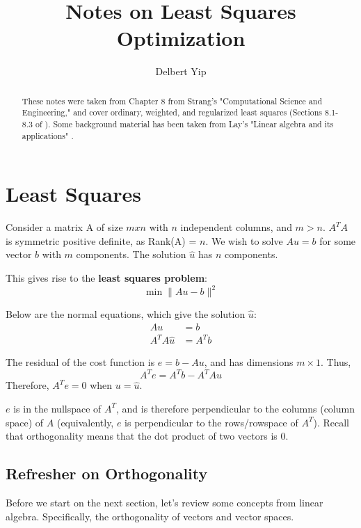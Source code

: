 \documentclass[]{article}
\title{Notes on Least Squares Optimization}
\author{Delbert Yip}
\begin{document}
\maketitle

\begin{abstract}
	These notes were taken from Chapter 8 from Strang's "Computational Science and Engineering," \cite{strang_computational_2012} and cover ordinary, weighted, and regularized least squares (Sections 8.1-8.3 of \cite{strang_computational_2012}). Some background material has been taken from Lay's "Linear algebra and its applications" \cite{lay_linear_2012}.
\end{abstract}

\section{Least Squares}
Consider a matrix A of size $m x n$ with $n$ independent columns, and $m > n$. 
$A^T A$ is symmetric positive definite, as Rank(A) = $n$. 
We wish to solve $Au = b$ for some vector $b$ with $m$ components. The solution $\hat{u}$ has $n$ components. 

This gives rise to the \textbf{least squares problem}:
\begin{equation}
\min \parallel Au - b \parallel ^2 
\end{equation}

Below are the normal equations, which give the solution $\hat{u}$:
\begin{align} 
Au &= b \nonumber \\
A^T A \hat{u} &= A^T b 
\end{align}

The residual of the cost function is $e = b - Au$, and has dimensions $m \times 1$. Thus, 
\begin{equation}
A^T e = A^T b - A^T A u
\end{equation}
Therefore, $A^T e = 0$ when $u = \hat{u}$. 

$e$ is in the nullspace of $A^T$, and is therefore perpendicular to the columns (column space) of $A$ (equivalently, $e$ is perpendicular to the rows/rowspace of $A^T$). Recall that orthogonality means that the dot product of two vectors is 0. 

\subsection{Refresher on Orthogonality}
Before we start on the next section, let's review some concepts from linear algebra. Specifically, the orthogonality of vectors and vector spaces. 
\end{document}
